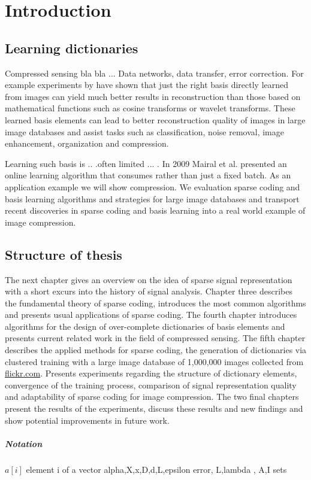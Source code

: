 \chapter{Introduction}
\label{sec:introduction}
\section{Learning dictionaries}


Compressed sensing bla bla ...
Data networks, data transfer, error correction. For example experiments by
\cite{} have shown that just the right basis directly learned from images can
yield much better results in reconstruction than those based on mathematical
functions such as cosine transforms or wavelet\cite{Elad2006,Mairal2010}
transforms. These learned basis elements can lead to better reconstruction
quality of images in large image databases and assist tasks such as
classification, noise removal, image enhancement, organization and compression. 

Learning such basis is .. .often limited ... . In 2009 Mairal et
al.\cite{Mairal2009} presented an online learning algorithm that consumes 
rather than just a fixed batch. As an application example we will show
compression. We evaluation sparse coding and basis learning algorithms and
strategies for large image databases and transport recent discoveries in sparse
coding and basis learning into a real world example of image compression.

\section{Structure of thesis}
The next chapter gives an overview on the idea of sparse signal
representation with a short excurs into the history of signal analysis.
Chapter three describes the fundamental theory of sparse coding, introduces the
most common algorithms and presents usual applications of sparse coding. The
fourth chapter introduces algorithms for the design of over-complete
dictionaries of basis elements and presents current related work in the field of
compressed sensing. The fifth chapter describes the applied methods for sparse
coding, the generation of dictionaries via clustered training with a large image
database of 1,000,000 images collected from \url{flickr.com}. Presents
experiments regarding the structure of dictionary elements, convergence of the
training process, comparison of signal representation quality and adaptability
of sparse coding for image compression. The two final chapters present the
results of the experiments, discuss these results and new findings and show
potential improvements in future work. 

\paragraph{Notation}
$a[i]$ element i of a vector
alpha,X,x,D,d,L,epsilon error, L,lambda , A,I sets


